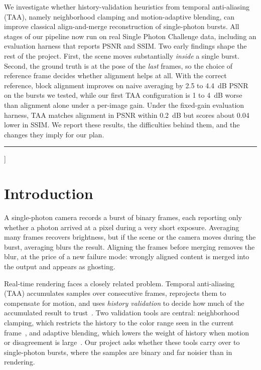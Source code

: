 \documentclass[10pt,twocolumn]{article}
\begin{document}
{\begin{center}
\begin{minipage}{0.94\textwidth}
  We investigate whether history-validation heuristics from temporal anti-aliasing (TAA), namely neighborhood clamping and motion-adaptive blending, can improve classical align-and-merge reconstruction of single-photon bursts. All stages of our pipeline now run on real Single Photon Challenge data, including an evaluation harness that reports PSNR and SSIM. Two early findings shape the rest of the project. First, the scene moves substantially \emph{inside} a single burst. Second, the ground truth is at the pose of the \emph{last} frames, so the choice of reference frame decides whether alignment helps at all. With the correct reference, block alignment improves on naive averaging by 2.5 to 4.4~dB PSNR on the bursts we tested, while our first TAA configuration is 1 to 4~dB worse than alignment alone under a per-image gain. Under the fixed-gain evaluation harness, TAA matches alignment in PSNR within 0.2~dB but scores about 0.04 lower in SSIM. We report these results, the difficulties behind them, and the changes they imply for our plan.
  \end{minipage}
  \end{center}
  \vspace{0.2em}
  \noindent\rule{\textwidth}{0.4pt}
  \vspace{1.2em}
}]

\section{Introduction}

A single-photon camera records a burst of binary frames, each reporting only whether a photon arrived at a pixel during a very short exposure. Averaging many frames recovers brightness, but if the scene or the camera moves during the burst, averaging blurs the result. Aligning the frames before merging removes the blur, at the price of a new failure mode: wrongly aligned content is merged into the output and appears as ghosting.

Real-time rendering faces a closely related problem. Temporal anti-aliasing (TAA) accumulates samples over consecutive frames, reprojects them to compensate for motion, and uses \emph{history validation} to decide how much of the accumulated result to trust~\cite{yang2020survey}. Two validation tools are central: neighborhood clamping, which restricts the history to the color range seen in the current frame~\cite{karis2014}, and adaptive blending, which lowers the weight of history when motion or disagreement is large~\cite{yang2009amortized}. Our project asks whether these tools carry over to single-photon bursts, where the samples are binary and far noisier than in rendering.
\end{document}

